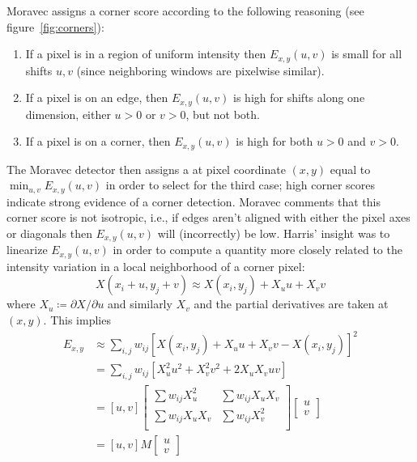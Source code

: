 Moravec assigns a corner score according to the following reasoning (see figure~\ref{fig:corners}):
\begin{mdframed}
	\begin{enumerate}
		\item If a pixel is in a region of uniform intensity then \(E_{x,y}(u,v)\) is small for all shifts \(u,v\) (since neighboring windows are pixelwise similar).
		\item If a pixel is on an edge, then \(E_{x,y}(u,v)\) is high for shifts along one dimension, either \(u > 0\) or \(v > 0\), but not both.
		\item If a pixel is on a corner, then \(E_{x,y}(u,v)\) is high for both \(u > 0\) and \(v > 0\).
	\end{enumerate}
\end{mdframed}
The Moravec detector then assigns a  at pixel coordinate \((x,y)\) equal to \(\min_{u,v} E_{x,y}(u,v)\) in order to select for the third case; high corner scores indicate strong evidence of a corner detection.
%
Moravec comments that this corner score is not isotropic, i.e., if edges aren't aligned with either the pixel axes or diagonals then \(E_{x,y}(u,v)\) will (incorrectly) be low.
%
Harris' insight was to linearize \(E_{x,y}(u,v)\) in order to compute a quantity more closely related to the intensity variation in a local neighborhood of a corner pixel:
\begin{equation}
	X(x_i + u,y_j + v) \approx  X(x_i,y_j) + X_u u + X_v v
\end{equation}
where \(X_u \coloneqq \partial X/\partial u\) and similarly \(X_v\) and the partial derivatives are taken at \((x,y)\).
%
This implies
\begin{align}
	E_{x,y} & \approx \sum_{i,j} w_{ij} \left[X(x_i,y_j) + X_u u + X_v v - X(x_i,y_j)\right]^2 \\
	        & = \sum_{i,j} w_{ij} \left[ X_u^2 u^2 + X_v^2 v^2 + 2 X_u X_v u v\right]          \\
	        & = \left[ u,v \right] \begin{bmatrix}
		\sum w_{ij}X_u^2   & \sum w_{ij}X_u X_v \\
		\sum w_{ij}X_u X_v & \sum w_{ij}X_v^2   \\
	\end{bmatrix}  \begin{bmatrix}
		u \\
		v
	\end{bmatrix}        \\
	        & = \left[ u,v \right] M  \begin{bmatrix}
		u \\
		v
	\end{bmatrix} \label{eqn:structurematrix}
\end{align}
